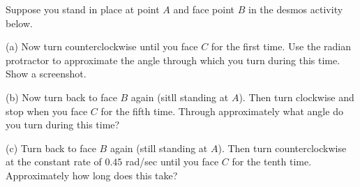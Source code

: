 \documentclass{ximera}
\begin{document}

 
 



\begin{exploration}\label{exp:angles1}
Suppose you stand in place at point $A$ and face point $B$ in the desmos activity below. 

(a) Now turn counterclockwise until you face $C$ for the first time. Use the radian protractor to approximate the angle through which you turn during this time. Show a screenshot.

(b) Now turn back to face $B$ again (sitll standing at $A$). Then turn clockwise and stop when you face $C$ for the fifth time. Through approximately what angle do you turn during this time? 

(c) Turn back to face $B$ again (still standing at $A$). Then turn counterclockwise at the constant rate of $0.45$ rad/sec until you face $C$ for the tenth time. Approximately how long does this take? 


 
\begin{onlineOnly}
    \begin{center}
\end{center}
\end{onlineOnly}
\end{exploration}
\end{document}
